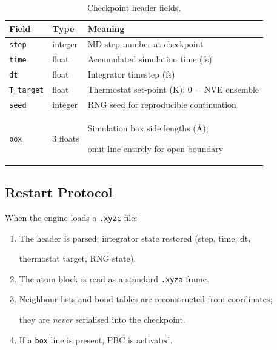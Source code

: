 \documentclass[12pt, a4paper, oneside]{article}
\begin{document}
\begin{table}[htbp]

  \centering

  \caption{Checkpoint header fields.}

  \label{tab:xyzc_header}

  \begin{tabular}{llp{7.5cm}}

    \toprule

    Field & Type & Meaning \\

    \midrule

    \texttt{step}      & integer & MD step number at checkpoint \\

    \texttt{time}      & float   & Accumulated simulation time (fs) \\

    \texttt{dt}        & float   & Integrator timestep (fs) \\

    \texttt{T\_target} & float   & Thermostat set-point (K); 0 = NVE ensemble \\

    \texttt{seed}      & integer & RNG seed for reproducible continuation \\

    \texttt{box}       & 3 floats & Simulation box side lengths (\AA);

                                    omit line entirely for open boundary \\

    \bottomrule

  \end{tabular}

\end{table}


\subsection{Restart Protocol}


When the engine loads a \texttt{.xyzc} file:


\begin{enumerate}

  \item The header is parsed; integrator state restored (step, time, dt,

        thermostat target, RNG state).

  \item The atom block is read as a standard \texttt{.xyza} frame.

  \item Neighbour lists and bond tables are reconstructed from coordinates;

        they are \emph{never} serialised into the checkpoint.

  \item If a \texttt{box} line is present, PBC is activated.

\end{enumerate}
\end{document}
